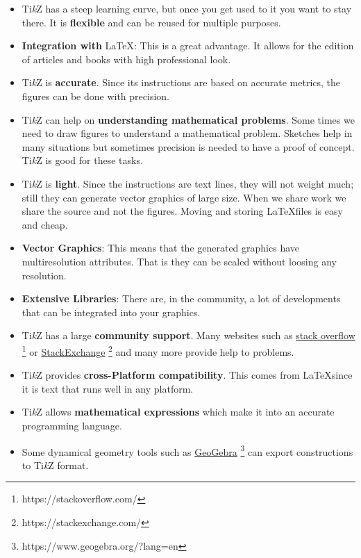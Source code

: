 \documentclass[12pt]{article}
\newcommand{\myTikZ}{Ti\textit{k}Z }
\newcommand{\myLaTeX}{\LaTeX \space  }
\begin{document}
\begin{itemize}
  \item \myTikZ has a steep learning curve, but once you get used to it you want to stay there.
    It is \textbf{flexible} and can be reused for multiple purposes.  
  \item \textbf{Integration with} \myLaTeX : This is a great advantage. 
    It allows for the edition of articles and books with high professional look.
  \item \myTikZ is
    \textbf{accurate}. Since its instructions are based on accurate metrics, the figures can be
    done with precision.  
  \item \myTikZ can help on \textbf{understanding mathematical
    problems}.  Some times we need to draw figures to understand a mathematical problem.
    Sketches help in many situations but sometimes precision is needed to have a proof of
    concept. \myTikZ is good for these tasks.  
  \item \myTikZ is  \textbf{light}. Since the
    instructions are text lines, they will not weight much; still they can generate vector
    graphics of large size. When we share work we share the source and not the figures. Moving
    and storing \myLaTeX files is easy and cheap.
  \item \textbf{Vector Graphics}: This means that the generated graphics have multiresolution
    attributes. That is they can be scaled without loosing any resolution.
  \item \textbf{Extensive Libraries}: There are, in the community, a lot of developments that
    can be integrated into your graphics.
  \item \myTikZ has a large \textbf{community support}. Many websites such as
    \href{https://stackoverflow.com/}{stack overflow}
    \footnote{https://stackoverflow.com/}
    or 
    \href{https://stackexchange.com/}{StackExchange}
    \footnote{https://stackexchange.com/}
    and many more provide help to problems.
  \item \myTikZ provides \textbf{cross-Platform compatibility}.  This comes from
    \myLaTeX since it is text that runs well in any platform.
  \item \myTikZ allows \textbf{mathematical expressions} which make it into an accurate
    programming language.
  \item Some dynamical geometry tools such as
    \href{https://www.geogebra.org/?lang=en}{GeoGebra}
    \footnote{https://www.geogebra.org/?lang=en}
    can export constructions to \myTikZ format.

\end{itemize}
\end{document}
